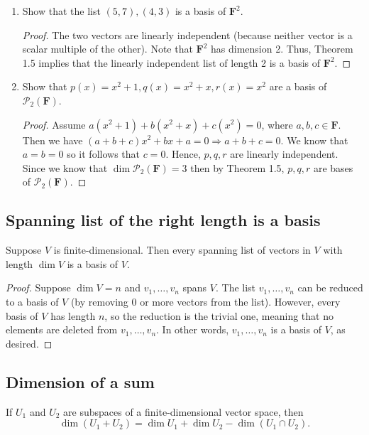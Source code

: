 \documentclass[11pt]{article}
\begin{document}
    \begin{enumerate}
        \item Show that the list \((5,7), (4,3)\) is a basis of \(\textbf{F}^2\). 
        \begin{proof}
            The two vectors are linearly independent (because neither vector is a scalar multiple of the other). Note that \(\textbf{F}^2\) has dimension 2. Thus, Theorem 1.5 implies that the linearly independent list of length 2 is a basis of \(\textbf{F}^2\).
        \end{proof}
        \item Show that \(p(x) = x^2 + 1, q(x) = x^2 + x, r(x) = x^2\) are a basis of \(\mathcal{P}_2(\textbf{F})\).
        \begin{proof}
            Assume \(a(x^2 + 1) + b(x^2 + x) + c(x^2) = 0\), where \(a,b,c \in \textbf{F}\). Then we have \((a + b + c)x^2 + bx + a = 0 \Rightarrow a + b + c = 0.\) We know that \(a = b = 0\) so it follows that \(c = 0\). Hence, $p,q,r$ are linearly independent. Since we know that \(\dim \mathcal{P}_2(\textbf{F}) = 3\) then by Theorem 1.5, $p,q,r$ are bases of \(\mathcal{P}_2(\textbf{F})\).
        \end{proof}
    \end{enumerate}

    \subsection{Spanning list of the right length is a basis}

    Suppose $V$ is finite-dimensional. Then every spanning list of vectors in $V$ with length \(\dim V\) is a basis of $V$.

    \begin{proof}
        Suppose \(\dim V = n\) and \(v_1, \dots, v_n\) spans $V$. The list \(v_1, \dots, v_n\) can be reduced to a basis of $V$ (by removing 0 or more vectors from the list). However, every basis of $V$ has length $n$, so the reduction is the trivial one, meaning that no elements are deleted from \(v_1, \dots, v_n\). In other words, \(v_1, \dots, v_n\) is a basis of $V$, as desired.
    \end{proof}

    \subsection{Dimension of a sum}

    If $U_1$ and $U_2$ are subspaces of a finite-dimensional vector space, then \[\dim(U_1 + U_2) = \dim U_1 + \dim U_2 - \dim(U_1 \cap U_2).\]
\end{document}
